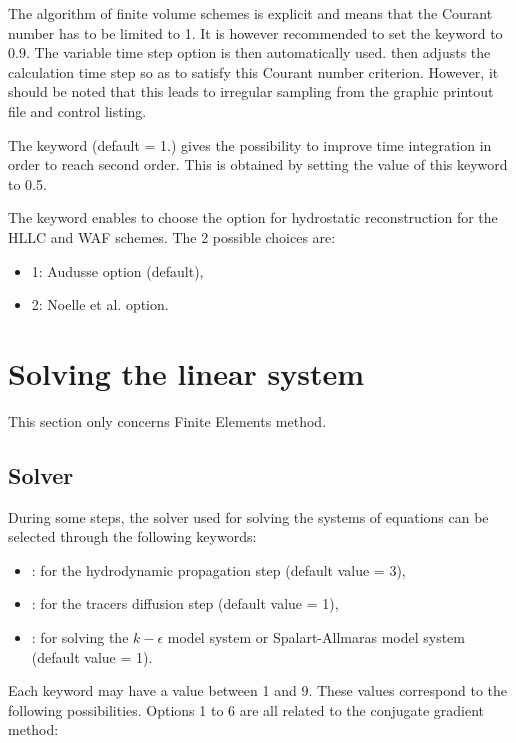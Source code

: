 The algorithm of finite volume schemes is explicit and means that
the Courant number has to be limited to 1.
It is however recommended to set the keyword 
to 0.9.
The variable time step option is then automatically used.
 then adjusts the calculation time step so as to satisfy
this Courant number criterion.
However, it should be noted that this leads to irregular sampling
from the graphic printout file and control listing.

The keyword  (default = 1.) gives
the possibility to improve time integration in order to reach second order.
This is obtained by setting the value of this keyword to 0.5.

The keyword 
enables to choose the option for hydrostatic reconstruction for the
HLLC and WAF schemes.
The 2 possible choices are:
\begin{itemize}
\item 1: Audusse option (default),
\item 2: Noelle et al. option.
\end{itemize}


\section{Solving the linear system}

This section only concerns Finite Elements method.
\subsection{Solver}

During some steps, the solver used for solving the systems of equations
can be selected through the following keywords:

\begin{itemize}
\item {}: for the hydrodynamic propagation step
(default value = 3),

\item {}: for the tracers diffusion step
(default value = 1),

\item {}:
for solving the $k-\epsilon$ model system or Spalart-Allmaras model system
(default value = 1).
\end{itemize}

Each keyword may have a value between 1 and 9.
These values correspond to the following possibilities.
Options 1 to 6 are all related to the conjugate gradient method:

